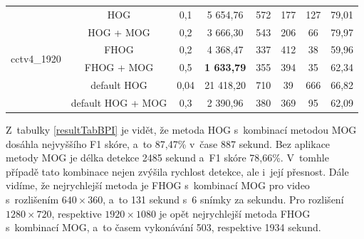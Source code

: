\begin{table}[H]
\begin{tabular}{|c|c|c|c|c|c|c|c|}
\multirow{6}{*}{cctv4\_1920}& HOG &                    0,1        & 5 654,76         & 572 &   177 &     127&      79,01      \\ \cline{2-8}  
                              & HOG + MOG &            0,2        & 3 666,30         & 543 &   206 &      66&      79,97      \\ \cline{2-8}  
                              & FHOG &                 0,2        & 4 368,47         & 337 &   412 &     38 &      59,96      \\ \cline{2-8}  
                              & FHOG + MOG &           0,5        & \textbf{1 633,79}& 355 &   394 &     35 &      62,34      \\ \cline{2-8}  
                              &  default HOG &         0,04       & 21 418,20        & 710 &   39  &     666&      66,82      \\ \cline{2-8}  
                              &  default HOG + MOG &   0,3        & 2 390,96         & 380 &   369 &     95 &      62,09      \\ \hline  
\end{tabular}
\end{table}
Z~tabulky \ref{resultTabBPI} je vidět, že metoda HOG s~kombinací metodou MOG dosáhla nejvyššího F1 skóre, a~to 87,47\% v~čase 887 sekund. Bez aplikace metody MOG je délka detekce 2485 sekund a~F1 skóre 78,66\%. V~tomhle případě tato kombinace nejen zvýšila rychlost detekce, ale i~její přesnost. Dále vidíme, že nejrychlejší metoda je FHOG s~kombinací MOG pro video s~rozlišením $640\times360$, a~to 131 sekund s~6 snímky za sekundu. Pro rozlišení $1280\times720$, respektive $1920\times1080$ je opět nejrychlejší metoda FHOG s~kombinací MOG, a~to časem vykonávání 503, respektive 1934 sekund.
